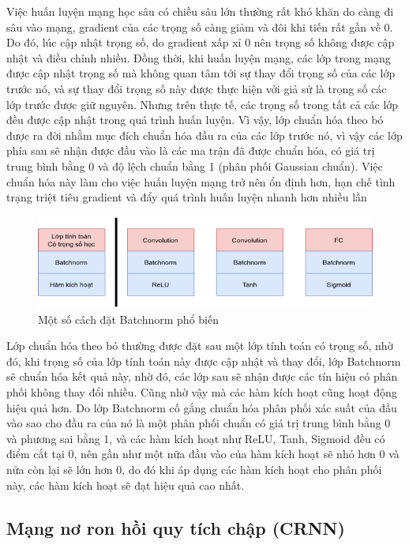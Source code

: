 Việc huấn luyện mạng học sâu có chiều sâu lớn thường rất khó khăn do càng đi sâu vào mạng, gradient của các trọng số càng giảm và đôi khi tiến rất gần về 0. Do đó, lúc cập nhật trọng số, do gradient xấp xỉ 0 nên trọng số không được cập nhật và điều chỉnh nhiều. Đồng thời, khi huấn luyện mạng, các lớp trong mạng được cập nhật trọng số mà không quan tâm tới sự thay đổi trọng số của các lớp trước nó, và sự thay đổi trọng số này được thực hiện với giả sử là trọng số các lớp trước được giữ nguyên. Nhưng trên thực tế, các trọng số trong tất cả các lớp đều được cập nhật trong quá trình huấn luyện. Vì vậy, lớp chuẩn hóa theo bó được ra đời nhằm mục đích chuẩn hóa đầu ra của các lớp trước nó, vì vậy các lớp phía sau sẽ nhận được đầu vào là các ma trận đã được chuẩn hóa, có giá trị trung bình bằng 0 và độ lệch chuẩn bằng 1 (phân phối Gaussian chuẩn). Việc chuẩn hóa này làm cho việc huấn luyện mạng trở nên ổn định hơn, hạn chế tình trạng triệt tiêu gradient và đẩy quá trình huấn luyện nhanh hơn nhiều lần

\begin{figure}[H]
    \centering
    \includegraphics[width=13cm]{./content/materials/batchnorm.png}
    \caption{Một số cách đặt Batchnorm phổ biến}
\end{figure}

Lớp chuẩn hóa theo bó thường được đặt sau một lớp tính toán có trọng số, nhờ đó, khi trọng số của lớp tính toán này được cập nhật và thay đổi, lớp Batchnorm sẽ chuẩn hóa kết quả này, nhờ đó, các lớp sau sẽ nhận được các tín hiệu có phân phối không thay đổi nhiều. Cũng nhờ vậy mà các hàm kích hoạt cũng hoạt động hiệu quả hơn. Do lớp Batchnorm cố gắng chuẩn hóa phân phối xác suất của đầu vào sao cho đầu ra của nó là một phân phối chuẩn có giá trị trung bình bằng 0 và phương sai bằng 1, và các hàm kích hoạt như ReLU, Tanh, Sigmoid đều có điểm cắt tại 0, nên gần như một nữa đầu vào của hàm kích hoạt sẽ nhỏ hơn 0 và nửa còn lại sẽ lớn hơn 0, do đó khi áp dụng các hàm kích hoạt cho phân phối này, các hàm kích hoạt sẽ đạt hiệu quả cao nhất.

\subsection{Mạng nơ ron hồi quy tích chập (CRNN)}

